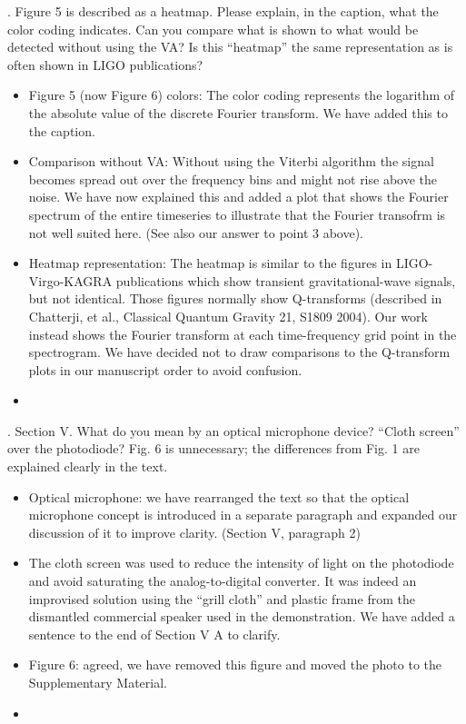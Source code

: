 \documentclass{article}
\begin{document}
. Figure 5 is described as a heatmap.  Please explain, in the caption, what the color coding indicates.  Can you compare what is shown to what would be detected without using the VA?  Is this ``heatmap'' the same representation as is often shown in LIGO publications?
\begin{itemize}
\item Figure 5 (now Figure 6) colors: The color coding represents the logarithm of the absolute value of the discrete Fourier transform. We have added this to the caption.
\item Comparison without VA: Without using the Viterbi algorithm the signal becomes spread out over the frequency bins and might not rise above the noise. We have now explained this and added a plot that shows the Fourier spectrum of the entire timeseries to illustrate that the Fourier transofrm is not well suited here. (See also our answer to point 3 above).
\item Heatmap representation: The heatmap is similar to the figures in LIGO-Virgo-KAGRA publications which show transient gravitational-wave signals, but not identical. Those figures normally show Q-transforms (described in Chatterji, et al., Classical Quantum Gravity 21, S1809 2004). Our work instead shows the Fourier transform at each time-frequency grid point in the spectrogram. We have decided not to draw comparisons to the Q-transform plots in our manuscript order to avoid confusion.
\item[]
\end{itemize}


. Section V.  What do you mean by an optical microphone device?  “Cloth screen” over the photodiode?  Fig. 6 is unnecessary; the differences from Fig. 1 are explained clearly in the text.
\begin{itemize}
\item Optical microphone: we have rearranged the text so that the optical microphone concept is introduced in a separate paragraph and expanded our discussion of it to improve clarity. (Section V, paragraph 2)
\item The cloth screen was used to reduce the intensity of light on the photodiode and avoid saturating the analog-to-digital converter. It was indeed an improvised solution using the ``grill cloth'' and plastic frame from the dismantled commercial speaker used in the demonstration. We have added a sentence to the end of Section V A to clarify.
\item Figure 6: agreed, we have removed this figure and moved the photo to the Supplementary Material.
\item []
\end{itemize}  
\end{document}
